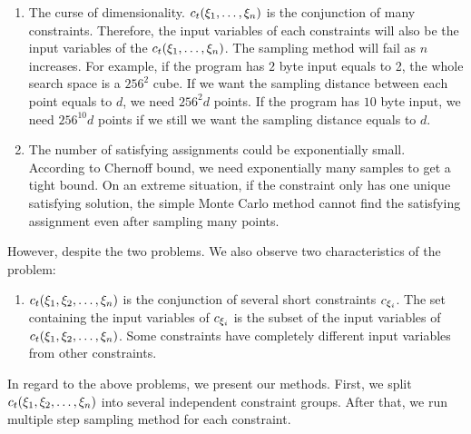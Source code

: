 \begin{enumerate}
      \item The curse of dimensionality. $c_t({{\xi}_{1}},\ldots,{{\xi}_{n}})$ is 
      the conjunction of many constraints. 
      Therefore, the input variables of each constraints will also be 
      the input variables of the $c_t({{\xi}_{1}},\ldots,{{\xi}_{n}})$. 
      The sampling method will fail as 
      $n$ increases. For example, if the program has $2$ byte input equals to 2, 
      the whole search space is 
      a $256^2$ cube. If we want the sampling distance between each point equals to $d$,
      we need $256^2d$ points. If the program has $10$ byte input, 
      we need $256^{10}d$ points if we 
      still we want the sampling distance equals to $d$. 

      \item The number of satisfying assignments could be exponentially small.
      According to Chernoff bound, we need exponentially many samples to get 
      a tight bound. On an extreme situation, if the constraint only has one unique
      satisfying solution, the simple Monte Carlo method cannot find the satisfying
      assignment even after sampling many points.
\end{enumerate}

However, despite the two problems. We also observe two characteristics
of the problem:
\begin{enumerate}
      \item $c_t({{\xi}_{1}},{{\xi}_{2}},\ldots,{{\xi}_{n}})$ is the conjunction of several
      short constraints $c_{{\xi}_{i}}$. The set containing the input variables of 
      $c_{{\xi}_{i}}$ is the subset of the input variables of 
      $c_t({{\xi}_{1}},{{\xi}_{2}},\ldots,{{\xi}_{n}})$.
      Some constraints have completely different input variables from other constraints.
      
\end{enumerate}

In regard to the above problems, we present our methods. First, we split 
$c_t({\xi}_{1},{\xi}_{2},\ldots,{\xi}_{n})$ into several independent constraint groups. After
that, we run multiple step sampling method for each constraint.

